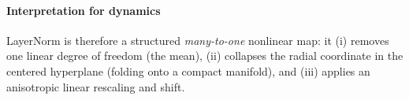 \documentclass[a4paper,12pt]{article}
\begin{document}
\paragraph{Interpretation for dynamics} %
LayerNorm is therefore a structured \emph{many-to-one} nonlinear map: it (i) removes one linear degree of freedom (the mean), (ii) collapses the radial coordinate in the centered hyperplane (folding onto a compact manifold), and (iii) applies an anisotropic linear rescaling and shift.
\end{document}
